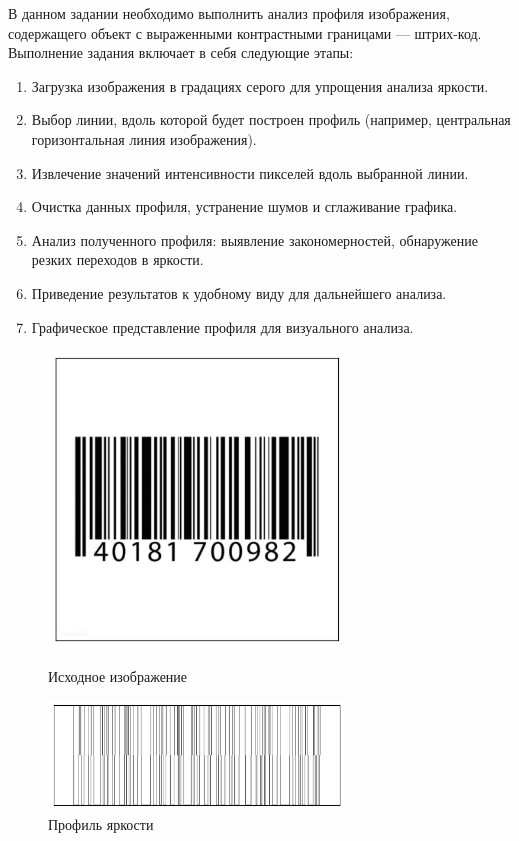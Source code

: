 \documentclass[a4paper,12pt]{article}
\begin{document}
В данном задании необходимо выполнить анализ профиля изображения, содержащего объект с выраженными контрастными границами --- штрих-код. Выполнение задания включает в себя следующие этапы:
\begin{enumerate}
    \item Загрузка изображения в градациях серого для упрощения анализа яркости.
    \item Выбор линии, вдоль которой будет построен профиль (например, центральная горизонтальная линия изображения).
    \item Извлечение значений интенсивности пикселей вдоль выбранной линии.
    \item Очистка данных профиля, устранение шумов и сглаживание графика.
    \item Анализ полученного профиля: выявление закономерностей, обнаружение резких переходов в яркости.
    \item Приведение результатов к удобному виду для дальнейшего анализа.
    \item Графическое представление профиля для визуального анализа.
\end{enumerate}
\begin{figure}[H]
    \centering
    \includegraphics[width=0.7\textwidth]{images/barcode.png}
    \caption{Исходное изображение}
    \label{fig:profile}
    \centering
    \includegraphics[width=0.7\textwidth]{images/code.png}
    \caption{Профиль яркости}
    \label{fig:profile}
\end{figure}
\end{document}
